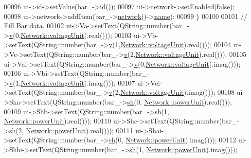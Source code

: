 \begin{DoxyCode}
00096     ui->id->setValue(bar\_->\hyperlink{group___models_gacf0fb781a73856bb7beb823304465e13}{id}());
00097     ui->network->setEnabled(\textcolor{keyword}{false});
00098     ui->network->addItem(bar\_->\hyperlink{group___models_gab0594d5d7313e8749bb85434b255db9a}{network}()->\hyperlink{class_network_ab6643733a517f930c60b06f5ffd78186}{name});
00099   \}
00100 
00101 \textcolor{comment}{// Fill Bar data.}
00102   ui->Va->setText(QString::number(bar\_->\hyperlink{group___models_gab3ed62a7f2eb9c41a0b84543f1ef8d3b}{v}(0,\hyperlink{group___models_gacde031ef95f5c05565ee35769f2ed89e}{Network::voltageUnit}).real()));
00103   ui->Vb->setText(QString::number(bar\_->\hyperlink{group___models_gab3ed62a7f2eb9c41a0b84543f1ef8d3b}{v}(1,\hyperlink{group___models_gacde031ef95f5c05565ee35769f2ed89e}{Network::voltageUnit}).real()));
00104   ui->Vc->setText(QString::number(bar\_->\hyperlink{group___models_gab3ed62a7f2eb9c41a0b84543f1ef8d3b}{v}(2,\hyperlink{group___models_gacde031ef95f5c05565ee35769f2ed89e}{Network::voltageUnit}).real()));
00105   ui->Vai->setText(QString::number(bar\_->\hyperlink{group___models_gab3ed62a7f2eb9c41a0b84543f1ef8d3b}{v}(0,\hyperlink{group___models_gacde031ef95f5c05565ee35769f2ed89e}{Network::voltageUnit}).imag()));
00106   ui->Vbi->setText(QString::number(bar\_->\hyperlink{group___models_gab3ed62a7f2eb9c41a0b84543f1ef8d3b}{v}(1,\hyperlink{group___models_gacde031ef95f5c05565ee35769f2ed89e}{Network::voltageUnit}).imag()));
00107   ui->Vci->setText(QString::number(bar\_->\hyperlink{group___models_gab3ed62a7f2eb9c41a0b84543f1ef8d3b}{v}(2,\hyperlink{group___models_gacde031ef95f5c05565ee35769f2ed89e}{Network::voltageUnit}).imag()));
00108   ui->Sha->setText(QString::number(bar\_->\hyperlink{group___models_gac020fff2f22a9caab71f21205b5773f8}{sh}(0, \hyperlink{group___models_ga9504015bc566f4a3d3b4d4a86000293b}{Network::powerUnit}).real()));
00109   ui->Shb->setText(QString::number(bar\_->\hyperlink{group___models_gac020fff2f22a9caab71f21205b5773f8}{sh}(1, \hyperlink{group___models_ga9504015bc566f4a3d3b4d4a86000293b}{Network::powerUnit}).real()));
00110   ui->Shc->setText(QString::number(bar\_->\hyperlink{group___models_gac020fff2f22a9caab71f21205b5773f8}{sh}(2, \hyperlink{group___models_ga9504015bc566f4a3d3b4d4a86000293b}{Network::powerUnit}).real()));
00111   ui->Shai->setText(QString::number(bar\_->\hyperlink{group___models_gac020fff2f22a9caab71f21205b5773f8}{sh}(0, \hyperlink{group___models_ga9504015bc566f4a3d3b4d4a86000293b}{Network::powerUnit}).imag()));
00112   ui->Shbi->setText(QString::number(bar\_->\hyperlink{group___models_gac020fff2f22a9caab71f21205b5773f8}{sh}(1, \hyperlink{group___models_ga9504015bc566f4a3d3b4d4a86000293b}{Network::powerUnit}).imag()));

\end{DoxyCode}
